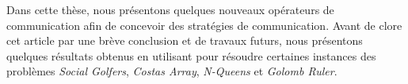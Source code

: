 Dans cette th\`ese, nous pr\'esentons quelques nouveaux op\'erateurs de communication afin de concevoir des strat\'egies de communication. Avant de clore cet article par une br\`eve conclusion et de travaux futurs, nous pr\'esentons quelques r\'esultats obtenus en utilisant \posl{} pour r\'esoudre certaines instances des probl\`emes {\it Social Golfers}, {\it Costas Array}, \textit{N-Queens} et \textit{Golomb Ruler}.
